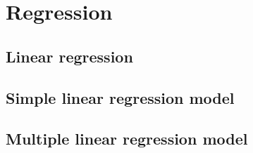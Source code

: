 \chapter{Regression}

\section{Linear regression}

\section{Simple linear regression model}

\section{Multiple linear regression model}